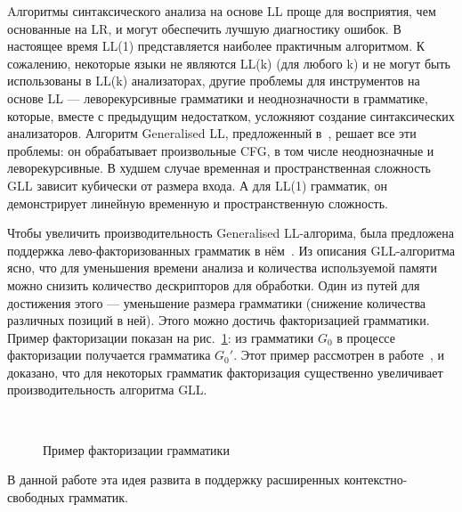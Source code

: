 \documentclass[14pt]{matmex-diploma-custom}
\begin{document}
	Aлгоритмы синтаксического анализа на основе 
    LL проще для восприятия, чем основанные на LR, и могут
	обеспечить лучшую диагностику ошибок. В настоящее время LL(1) представляется
	наиболее практичным алгоритмом. К сожалению, некоторые языки не являются LL(k) (для любого k)
    и не могут быть использованы в LL(k) анализаторах, другие проблемы для инструментов на основе LL 
    --- леворекурсивные грамматики и неоднозначности в грамматике, 
	которые, вместе с предыдущим недостатком, усложняют создание синтаксических 
	анализаторов. Алгоритм Generalised LL, предложенный в~\cite{scott2010gll}, решает 
	все эти проблемы: он обрабатывает произвольные CFG, в том числе неоднозначные и
	леворекурсивные.
	В худшем случае временная и пространственная сложность GLL зависит кубически от 
	размера входа. А для LL(1) грамматик, он демонстрирует линейную временную и
	пространственную сложность.
    
    Чтобы увеличить производительность Generalised LL-алгорима, была предложена поддержка 
    лево-факторизованных грамматик в нём~\cite{scott2016structuring}.
    Из описания GLL-алгоритма ясно, что для уменьшения времени анализа и количества используемой памяти
    можно снизить количество дескрипторов для обработки. Один из путей для достижения этого --- 
    уменьшение размера грамматики (снижение количества различных позиций в ней).
    Этого можно достичь факторизацией грамматики. Пример факторизации показан на рис.~\ref{fig:ExampleOfFactorization}:
    из грамматики $G_0$ в процессе факторизации получается грамматика $G_0'$.
    Этот пример рассмотрен в работе~\cite{scott2016structuring}, и доказано, что для некоторых грамматик факторизация 
    существенно увеличивает производительность алгоритма GLL.
    \begin{figure}
        \centering
        ~
        \caption{Пример факторизации грамматики}
        \label{fig:ExampleOfFactorization}
    \end{figure}
    В данной работе эта идея развита в поддержку расширенных контекстно-свободных грамматик.
	
\end{document}
